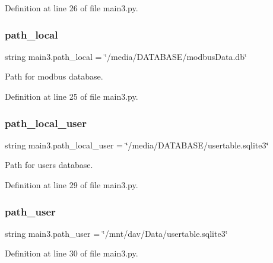 Definition at line 26 of file main3.\+py.

\mbox{\label{namespacemain3_a8e2441fb4fc06f2788b1864358403339}} 
\subsubsection{\texorpdfstring{path\+\_\+local}{path\_local}}
{\footnotesize\ttfamily string main3.\+path\+\_\+local = \char`\"{}/media/D\+A\+T\+A\+B\+A\+SE/modbus\+Data.\+db\char`\"{}}



Path for modbus database. 



Definition at line 25 of file main3.\+py.

\mbox{\label{namespacemain3_ab90723267d7b609bc02469c11db32a64}} 
\subsubsection{\texorpdfstring{path\+\_\+local\+\_\+user}{path\_local\_user}}
{\footnotesize\ttfamily string main3.\+path\+\_\+local\+\_\+user = \char`\"{}/media/D\+A\+T\+A\+B\+A\+SE/usertable.\+sqlite3\char`\"{}}



Path for users database. 



Definition at line 29 of file main3.\+py.

\mbox{\label{namespacemain3_a7e2fe5acbb746b4190127a6d04b418ed}} 
\subsubsection{\texorpdfstring{path\+\_\+user}{path\_user}}
{\footnotesize\ttfamily string main3.\+path\+\_\+user = \char`\"{}/mnt/dav/Data/usertable.\+sqlite3\char`\"{}}



Definition at line 30 of file main3.\+py.

